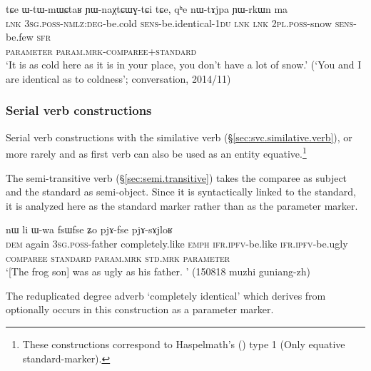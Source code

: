 \begin{exe}
\ex \label{ex:WtWmWCtaR.YWnaXtCWGtCi}
\glll tɕe ɯ-tɯ-mɯɕtaʁ ɲɯ-naχtɕɯɣ-tɕi tɕe, qʰe nɯ-tɤjpa ɲɯ-rkɯn ma\\
\textsc{lnk} \textsc{3sg}.\textsc{poss}-\textsc{nmlz}:\textsc{deg}-be.cold \textsc{sens}-be.identical-\textsc{1du} \textsc{lnk} \textsc{lnk} \textsc{2pl}.\textsc{poss}-snow \textsc{sens}-be.few \textsc{sfr}\\
{ } \textsc{parameter} \textsc{param}.\textsc{mrk}-\textsc{comparee+standard}\\
\glt `It is as cold here as it is in your place, you don't have a lot of snow.' (`You and I are identical as to coldness'; conversation, 2014/11)
\end{exe}
%
\subsubsection{Serial verb constructions} \label{sec:svc.equative}
Serial verb constructions with the similative verb  (§\ref{sec:svc.similative.verb}), or more rarely   and  as first verb can also be used as an entity equative.\footnote{These constructions correspond to  Haspelmath's (\citeyear{haspelmath17equative}) type 1 (Only equative standard-marker). }


The semi-transitive verb  (§\ref{sec:semi.transitive})  takes the comparee as subject and the standard as semi-object. Since it is syntactically linked to the standard, it is analyzed here as the standard marker rather than as the parameter marker. 
  
\begin{exe}
\ex \label{ex:pjAfse.pjAsAjloR}
\glll nɯ li ɯ-wa fsɯfse ʑo pjɤ-fse pjɤ-sɤjloʁ \\
\textsc{dem} again \textsc{3sg}.\textsc{poss}-father completely.like \textsc{emph} \textsc{ifr}.\textsc{ipfv}-be.like \textsc{ifr}.\textsc{ipfv}-be.ugly \\
\textsc{comparee} { } \textsc{standard} \textsc{param}.\textsc{mrk} { } \textsc{std}.\textsc{mrk} \textsc{parameter} \\
\glt `[The frog son] was as ugly as his father. ' (150818 muzhi guniang-zh)
\end{exe}

The reduplicated degree adverb  `completely identical' which derives from  optionally occurs in this construction as a parameter marker.

